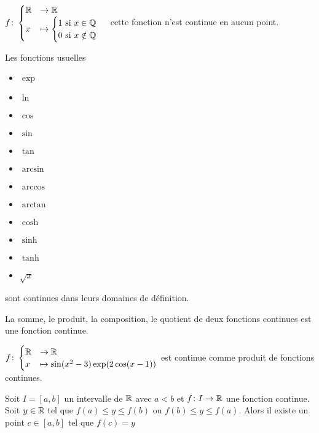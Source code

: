 \begin{exemple}
$ 
f \colon 
\begin{cases}
\mathbb{R} &\to \mathbb{R} \\
x &\mapsto 
\begin{cases}
1 \text{ si } x \in \mathbb{Q} \\
0 \text{ si } x \notin \mathbb{Q}
\end{cases}
\end{cases}
$
cette fonction n'est continue en aucun point.
\end{exemple}

\begin{remarque}
Les fonctions usuelles 
\begin{itemize}
\item $\exp$
\item $\ln$
\item $\cos$
\item $\sin$
\item $\tan$
\item $\arcsin$
\item $\arccos$
\item $\arctan$
\item $\cosh$
\item $\sinh$
\item $\tanh$
\item $\sqrt{x}$
\end{itemize}
sont continues dans leurs domaines de définition.
\end{remarque}

\begin{graybox}
\begin{theoreme}
La somme, le produit, la composition, le quotient de deux fonctions continues est une fonction continue.
\end{theoreme}
\end{graybox}

\begin{exemple}
$
f \colon 
\begin{cases}
\mathbb{R} &\to \mathbb{R} \\
x &\mapsto \sin(x^2 - 3)\exp(2\cos(x - 1))
\end{cases}
$
est continue comme produit de fonctions continues.
\end{exemple}

\begin{graybox}
\begin{theoreme}
Soit $I = [a, b]$ un intervalle de $\mathbb{R}$ avec $a < b$ et $f \colon I \to \mathbb{R}$ une fonction continue.
Soit $y \in \mathbb{R}$ tel que $f(a) \leq y \leq f(b)$ ou $f(b) \leq y \leq f(a)$.
Alors il existe un point $c \in [a, b]$ tel que $f(c) = y$
\end{theoreme}
\end{graybox}

